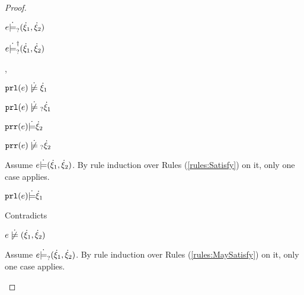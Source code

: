 \begin{proof}
\begin{byCases}
\begin{byCases}
\begin{byCases}
\begin{byCases}
\begin{pfsteps*}
                \item $e \dot{\models}_{?} (\dot{\xi}_1 , \dot{\xi}_2)$  
                \item $e \dot{\models}_{?}^{\dag} (\dot{\xi}_1 , \dot{\xi}_2)$ 
                \end{pfsteps*}
            \end{byCases}
        \item[\cnotsatisfyormay{\hprl{e}}{\hxi_1},\csatisfy{\hprr{e}}{\hxi_2}]
            \begin{pfsteps*}
            \item $\cnotsatisfy{\hprl{e}}{\hxi_1}$  
            \item $\cnotmaysatisfy{\hprl{e}}{\hxi_1}$  
            \item $\mathtt{prr}(e) \dot{\models} \dot{\xi}_2$  
            \item $\cnotmaysatisfy{\hprr{e}}{\hxi_2}$  
            \end{pfsteps*}
            Assume $e \dot{\models} (\dot{\xi}_1 , \dot{\xi}_2)$. By rule induction over Rules (\ref{rules:Satisfy}) on it, only one case applies.
            \begin{byCases}
            \item[\text{(\ref{rule:CSNotIntroPair})}]
                \begin{pfsteps*}
                \item $\mathtt{prl}(e) \dot{\models} \dot{\xi}_1$ 
                \end{pfsteps*}
                Contradicts 
            \end{byCases}
            \begin{pfsteps*}
            \item $\cnotsatisfy{e}{\cpair{\hxi_1}{\hxi_2}}$  
            \end{pfsteps*}
            Assume $e \dot{\models}_{?} (\dot{\xi}_1 , \dot{\xi}_2)$. By rule induction over Rules (\ref{rules:MaySatisfy}) on it, only one case applies.
            \begin{byCases}
            \item[\text{(\ref{rule:CMSNotIntro})}]

\end{byCases}
\end{byCases}
\end{byCases}
\end{byCases}
\end{proof}
